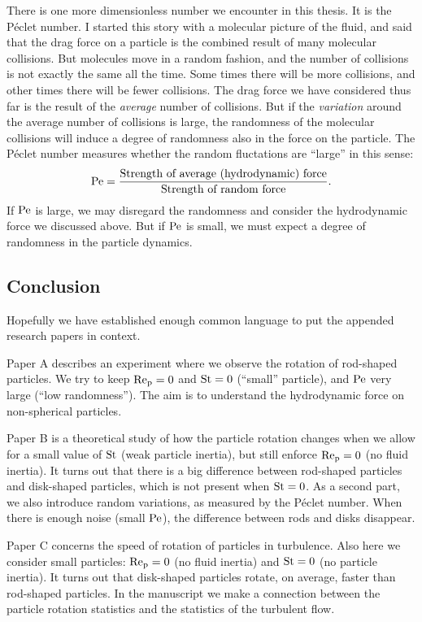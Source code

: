 \documentclass[thesis.tex]{subfiles}
\begin{document}
There is one more dimensionless number we encounter in this thesis. It is the P\'eclet number. I started this story with a molecular picture of the fluid, and said that the drag force on a particle is the combined result of many molecular collisions. But molecules move in a random fashion, and the number of collisions is not exactly the same all the time. Some times there will be more collisions, and other times there will be fewer collisions. The drag force we have considered thus far is the result of the \emph{average} number of collisions. But if the \emph{variation} around the average number of collisions is large, the randomness of the molecular collisions will induce a degree of randomness also in the force on the particle. The P\'eclet number measures whether the random fluctations are ``large'' in this sense:
\begin{align*}
 	\mbox{Pe} = \frac{\textrm{Strength of average (hydrodynamic) force}}{\textrm{Strength of random force}}.
\end{align*}
If $\mbox{Pe}$ is large, we may disregard the randomness and consider the hydrodynamic force we discussed above. But if $\mbox{Pe}$ is small, we must expect a degree of randomness in the particle dynamics.

\subsection*{Conclusion}

Hopefully we have established enough common language to put the appended research papers in context.

Paper A describes an experiment where we observe the rotation of rod-shaped particles. We try to keep $\mbox{Re}_{\mathrm p}=0$ and $\mbox{St}=0$ (``small'' particle), and $\mbox{Pe}$ very large (``low randomness''). The aim is to understand the hydrodynamic force on non-spherical particles.

Paper B is a theoretical study of how the particle rotation changes when we allow for a small value of $\mbox{St}$ (weak particle inertia), but still enforce $\mbox{Re}_{\mathrm p}=0$ (no fluid inertia). It turns out that there is a big difference between rod-shaped particles and disk-shaped particles, which is not present when $\mbox{St}=0$. As a second part, we also introduce random variations, as measured by the P\'eclet number. When there is enough noise (small $\mbox{Pe}$), the difference between rods and disks disappear.

Paper C concerns the speed of rotation of particles in turbulence. Also here we consider small particles: $\mbox{Re}_{\mathrm p}=0$ (no fluid inertia) and $\mbox{St}=0$ (no particle inertia). It turns out that disk-shaped particles rotate, on average, faster than rod-shaped particles. In the manuscript we make a connection between the particle rotation statistics and the statistics of the turbulent flow. 
\end{document}
